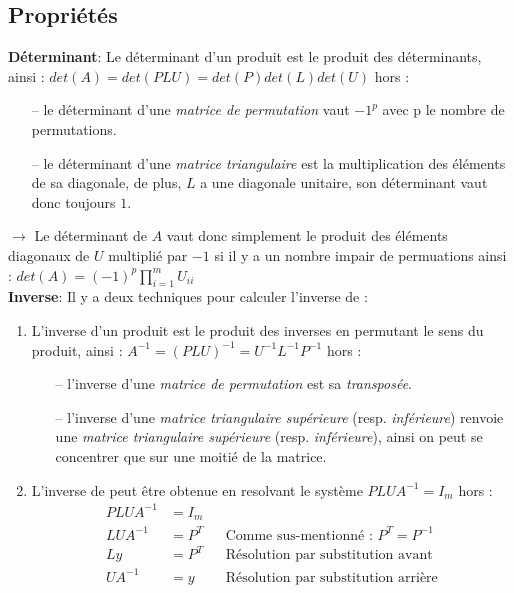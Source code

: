 \documentclass{article}[11pt]
\begin{document}
\subsection{Propriétés}
\textbf{Déterminant}: Le déterminant d'un produit est le produit des déterminants, ainsi : $det(A)=det(PLU)=det(P)det(L)det(U)$ hors :
\begin{itemize}
    \item[--] le déterminant d'une \textit{matrice de permutation} vaut $-1^{p}$ avec p le nombre de permutations.
    \item[--] le déterminant d'une \textit{matrice triangulaire} est la multiplication des éléments de sa diagonale, de plus, $L$ a une diagonale unitaire, son déterminant vaut donc toujours $1$.
\end{itemize}
$\rightarrow$ Le déterminant de $A$ vaut donc simplement le produit des éléments diagonaux de $U$ multiplié par $-1$ si il y a un nombre impair de permuations ainsi : $det(A)=(-1)^{p}\prod_{i=1}^{m}U_{ii}$ \\
\noindent
\newline
\textbf{Inverse}:
Il y a deux techniques pour calculer l'inverse de :
\begin{enumerate}
    \item L'inverse d'un produit est le produit des inverses en permutant le sens du produit, ainsi : $A^{-1}=(PLU)^{-1}=U^{-1}L^{-1}P^{-1}$ hors :
    \begin{itemize}
        \item[--] l'inverse d'une \textit{matrice de permutation} est sa \textit{transposée}.
        \item[--] l'inverse d'une \textit{matrice triangulaire supérieure} (resp. \textit{inférieure}) renvoie une \textit{matrice triangulaire supérieure} (resp. \textit{inférieure}), ainsi on peut se concentrer que sur une moitié de la matrice.
    \end{itemize}
    \item L'inverse de  peut être obtenue en resolvant le système $PLUA^{-1}=I_m$ hors :
        \begin{align*}
            PLUA^{-1}&=I_m \\
            LUA^{-1}&=P^T && \text{Comme sus-mentionné : }P^T=P^{-1}\\
            Ly&=P^T       && \text{Résolution par substitution avant}\\
            UA^{-1}&=y    && \text{Résolution par substitution arrière}\\
        \end{align*}
\end{enumerate}
\end{document}
